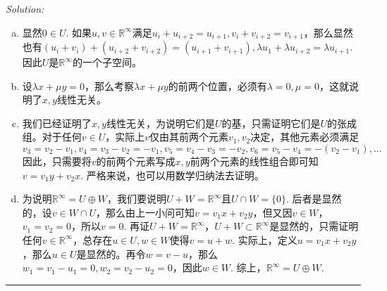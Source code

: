 \documentclass[a4[paper]{article}
\newcommand\R{\mathbb{R}}  %
\begin{document}
\noindent{}\emph{Solution:}
\begin{enumerate}[(a).]
		\item 显然$0 \in U$. 如果$u,v\in\R^\infty$满足$u_i+u_{i+2}=u_{i+1},v_i+v_{i+2}=v_{i+1}$，那么显然也有$(u_i+v_i)+(u_{i+2}+v_{i+2})=(u_{i+1}+v_{i+1}), \lambda u_1+\lambda u_{i+2} = \lambda u_{i+1}$. 因此$U$是$\R^\infty$的一个子空间。
		\item 设$\lambda x+\mu y=0$，那么考察$\lambda x+\mu y$的前两个位置，必须有$\lambda=0,\mu=0$，这就说明了$x,y$线性无关。
		\item 我们已经证明了$x,y$线性无关，为说明它们是$U$的基，只需证明它们是$U$的张成组。对于任何$v\in U$，实际上$v$仅由其前两个元素$v_1,v_2$决定，其他元素必须满足
\[v_3=v_2-v_1,v_4 = v_3-v_2 = -v_1,v_5 = v_4-v_3 = -v_2,v_6=v_5-v_4=-(v_2-v_1),...\]
因此，只需要将$v$的前两个元素写成$x,y$前两个元素的线性组合即可知$v = v_1 y+ v_2 x$. 严格来说，也可以用数学归纳法去证明。
		\item 为说明$\R^\infty=U\oplus W$，我们要说明$U+W=\R^\infty$且$U\cap W=\{0\}$. 后者是显然的，设$v\in W\cap U$，那么由上一小问可知$v =v_1x+v_2y$，但又因$v\in W$，$v_1=v_2=0$，所以$v=0$. 再证$U+W=\R^\infty$，$U+W\subset\R^\infty$是显然的，只需证明任何$v\in\R^\infty$，总存在$u\in U,w\in W$使得$v = u+w$. 实际上，定义$u = v_1 x+v_2y$，那么$u\in U$是显然的。再令$w = v-u$，那么$w_1 = v_1-u_1 =0, w_2=v_2-u_2=0$，因此$w\in W$. 综上，$\R^\infty=U\oplus W$.
\end{enumerate}

\bigskip
\noindent{}\rule{\textwidth}{0.1mm}
\bigskip
\end{document}
